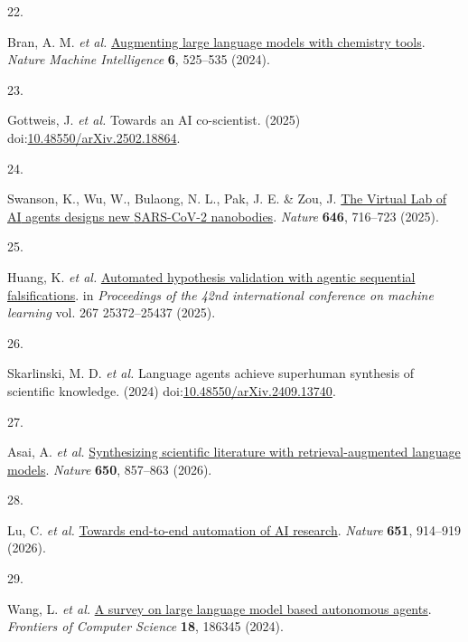 \documentclass[
]{article}
\newlength{\cslhangindent}
\newlength{\csllabelwidth}
\newlength{\cslentryspacingunit} %
\newenvironment{CSLReferences}[2] %
 {%
  \setlength{\parindent}{0pt}
  \ifodd #1
  \let\oldpar\par
  \def\par{\hangindent=\cslhangindent\oldpar}
  \fi
  \setlength{\parskip}{#2\cslentryspacingunit}
 }%
 {}
\newcommand{\CSLLeftMargin}[1]{\parbox[t]{\csllabelwidth}{#1}}
\newcommand{\CSLRightInline}[1]{\parbox[t]{\linewidth - \csllabelwidth}{#1}\break}
\begin{document}
\begin{CSLReferences}{0}{0}
\leavevmode{}%
\CSLLeftMargin{22. }%
\CSLRightInline{Bran, A. M. \emph{et al.}
\href{https://doi.org/10.1038/s42256-024-00832-8}{Augmenting large
language models with chemistry tools}. \emph{Nature Machine
Intelligence} \textbf{6}, 525--535 (2024).}

\leavevmode{}%
\CSLLeftMargin{23. }%
\CSLRightInline{Gottweis, J. \emph{et al.} Towards an {AI} co-scientist.
(2025)
doi:\href{https://doi.org/10.48550/arXiv.2502.18864}{10.48550/arXiv.2502.18864}.}

\leavevmode{}%
\CSLLeftMargin{24. }%
\CSLRightInline{Swanson, K., Wu, W., Bulaong, N. L., Pak, J. E. \& Zou,
J. \href{https://doi.org/10.1038/s41586-025-09442-9}{The {Virtual Lab}
of {AI} agents designs new {SARS-CoV-2} nanobodies}. \emph{Nature}
\textbf{646}, 716--723 (2025).}

\leavevmode{}%
\CSLLeftMargin{25. }%
\CSLRightInline{Huang, K. \emph{et al.}
\href{https://proceedings.mlr.press/v267/huang25n.html}{Automated
hypothesis validation with agentic sequential falsifications}. in
\emph{Proceedings of the 42nd international conference on machine
learning} vol. 267 25372--25437 (2025).}

\leavevmode{}%
\CSLLeftMargin{26. }%
\CSLRightInline{Skarlinski, M. D. \emph{et al.} Language agents achieve
superhuman synthesis of scientific knowledge. (2024)
doi:\href{https://doi.org/10.48550/arXiv.2409.13740}{10.48550/arXiv.2409.13740}.}

\leavevmode{}%
\CSLLeftMargin{27. }%
\CSLRightInline{Asai, A. \emph{et al.}
\href{https://doi.org/10.1038/s41586-025-10072-4}{Synthesizing
scientific literature with retrieval-augmented language models}.
\emph{Nature} \textbf{650}, 857--863 (2026).}

\leavevmode{}%
\CSLLeftMargin{28. }%
\CSLRightInline{Lu, C. \emph{et al.}
\href{https://doi.org/10.1038/s41586-026-10265-5}{Towards end-to-end
automation of {AI} research}. \emph{Nature} \textbf{651}, 914--919
(2026).}

\leavevmode{}%
\CSLLeftMargin{29. }%
\CSLRightInline{Wang, L. \emph{et al.}
\href{https://doi.org/10.1007/s11704-024-40231-1}{A survey on large
language model based autonomous agents}. \emph{Frontiers of Computer
Science} \textbf{18}, 186345 (2024).}


\end{CSLReferences}
\end{document}
